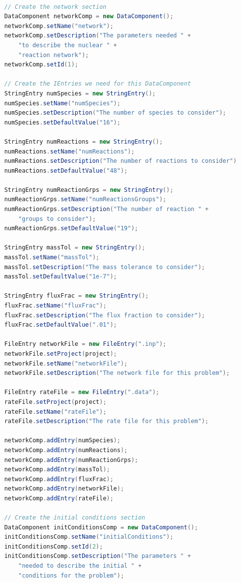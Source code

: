 \begin{lstlisting}[language=Java]

    // Create the network section
    DataComponent networkComp = new DataComponent();
    networkComp.setName("network");
    networkComp.setDescription("The parameters needed " +
        "to describe the nuclear " +
    	"reaction network"); 
    networkComp.setId(1);
    
    // Create the IEntries we need for this DataComponent
    StringEntry numSpecies = new StringEntry();
    numSpecies.setName("numSpecies");
    numSpecies.setDescription("The number of species to consider");
    numSpecies.setDefaultValue("16");
    
    StringEntry numReactions = new StringEntry();
    numReactions.setName("numReactions");
    numReactions.setDescription("The number of reactions to consider");
    numReactions.setDefaultValue("48");
    
    StringEntry numReactionGrps = new StringEntry();
    numReactionGrps.setName("numReactionsGroups");
    numReactionGrps.setDescription("The number of reaction " + 
    	"groups to consider"); 
    numReactionGrps.setDefaultValue("19");

    StringEntry massTol = new StringEntry();
    massTol.setName("massTol");
    massTol.setDescription("The mass tolerance to consider");
    massTol.setDefaultValue("1e-7");
    
    StringEntry fluxFrac = new StringEntry();
    fluxFrac.setName("fluxFrac");
    fluxFrac.setDescription("The flux fraction to consider");
    fluxFrac.setDefaultValue(".01");
    
    FileEntry networkFile = new FileEntry(".inp");
    networkFile.setProject(project);
    networkFile.setName("networkFile");
    networkFile.setDescription("The network file for this problem");
    
    FileEntry rateFile = new FileEntry(".data");
    rateFile.setProject(project);
    rateFile.setName("rateFile");
    rateFile.setDescription("The rate file for this problem");
    
    networkComp.addEntry(numSpecies);
    networkComp.addEntry(numReactions);
    networkComp.addEntry(numReactionGrps); 
    networkComp.addEntry(massTol);
    networkComp.addEntry(fluxFrac);
    networkComp.addEntry(networkFile);
    networkComp.addEntry(rateFile);
    
    // Create the initial conditions section
    DataComponent initConditionsComp = new DataComponent();
    initConditionsComp.setName("initialConditions");
    initConditionsComp.setId(2);
    initConditionsComp.setDescription("The parameters " +
    	"needed to describe the	initial " + 
    	"conditions for the problem");
    

\end{lstlisting}
